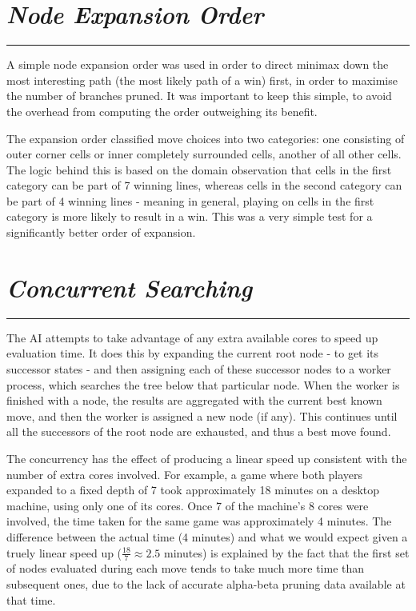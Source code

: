 \documentclass[10pt]{report}
\begin{document}
\begin{multicols}{2}
\section*{\emph{\textmd{Node Expansion Order}}}
\hrule
\vspace{0.4cm}

A simple node expansion order was used in order to direct minimax down the most interesting path (the most likely path of a win) first, in order to maximise the number of branches pruned. It was important to keep this simple, to avoid the overhead from computing the order outweighing its benefit.

The expansion order classified move choices into two categories: one consisting of outer corner cells or inner completely surrounded cells, another of all other cells. The logic behind this is based on the domain observation that cells in the first category can be part of 7 winning lines, whereas cells in the second category can be part of 4 winning lines - meaning in general, playing on cells in the first category is more likely to result in a win. This was a very simple test for a significantly better order of expansion.

\section*{\emph{\textmd{Concurrent Searching}}}
\hrule
\vspace{0.4cm}

The AI attempts to take advantage of any extra available cores to speed up evaluation time. It does this by expanding the current root node - to get its successor states - and then assigning each of these successor nodes to a worker process, which searches the tree below that particular node. When the worker is finished with a node, the results are aggregated with the current best known move, and then the worker is assigned a new node (if any). This continues until all the successors of the root node are exhausted, and thus a best move found.

The concurrency has the effect of producing a linear speed up consistent with the number of extra cores involved. For example, a game where both players expanded to a fixed depth of 7 took approximately 18 minutes on a desktop machine, using only one of its cores. Once 7 of the machine's 8 cores were involved, the time taken for the same game was approximately 4 minutes. The difference between the actual time (4 minutes) and what we would expect given a truely linear speed up ($\frac{18}{7} \approx 2.5$ minutes) is explained by the fact that the first set of nodes evaluated during each move tends to take much more time than subsequent ones, due to the lack of accurate alpha-beta pruning data available at that time.


\end{multicols}
\end{document}
